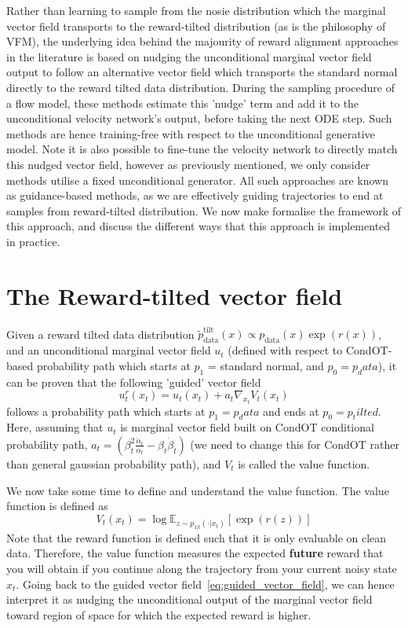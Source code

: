 \documentclass[12pt,a4paper]{report}
\begin{document}
Rather than learning to sample from the nosie distribution which the marginal vector field transports to the reward-tilted distribution (as is the philosophy of VFM), the underlying idea behind the majourity of reward alignment approaches in the literature is based on nudging the unconditional marginal vector field output to follow an alternative vector field which transports the standard normal directly to the reward tilted data distribution. During the sampling procedure of a flow model, these methods estimate this 'nudge' term and add it to the unconditional velocity network's output, before taking the next ODE step. Such methods are hence training-free with respect to the unconditional generative model. 
Note it is also possible to fine-tune the velocity network to directly match this nudged vector field, however as previously mentioned, we only consider methods utilise a fixed unconditional generator.
All such approaches are known as guidance-based methods, as we are effectively guiding trajectories to end at samples from reward-tilted distribution. 
We now make formalise the framework of this approach, and discuss the different ways that this approach is implemented in practice. 

\section{The Reward-tilted vector field}
Given a reward tilted data distribution $\widetilde{p}_{\text{data}}^{\text{tilt}}(x) \propto p_{\text{data}}(x) \exp (r(x))$, and an unconditional marginal vector field $u_t$ (defined with respect to CondOT-based probability path which starts at $p_1$ = standard normal, and $p_0 = p_data$), it can be proven that the following 'guided' vector field 
\begin{equation}
    u_t^r(x_t) = u_t(x_t) + a_t \nabla_{x_t}V_t(x_t)
    \label{eq:guided_vector_field}
\end{equation}
follows a probability path which starts at $p_1 = p_data$ and ends at $p_0 = p_tilted$. 
Here, assuming that $u_t$ is marginal vector field built on CondOT conditional probability path, $a_t = \left( \beta_t^2 \frac{\dot{\alpha}_t}{\alpha_t} - \beta_t \dot{\beta}_t \right)$ (we need to change this for CondOT rather than general gaussian probability path), and $V_t$ is called the value function. 

We now take some time to define and understand the value function. The value function is defined as
\begin{equation}
    V_t(x_t) = \log \mathbb{E}_{z \sim p_{1|t}(\cdot|x_t)}[\exp(r(z))]
\end{equation}
Note that the reward function is defined such that it is only evaluable on clean data. 
Therefore, the value function measures the expected \textbf{future} reward that you will obtain if you continue along the trajectory from your current noisy state $x_t$.
Going back to the guided vector field~\ref{eq:guided_vector_field}, we can hence interpret it as nudging the unconditional output of the marginal vector field toward region of space for which the expected reward is higher. 
\end{document}
